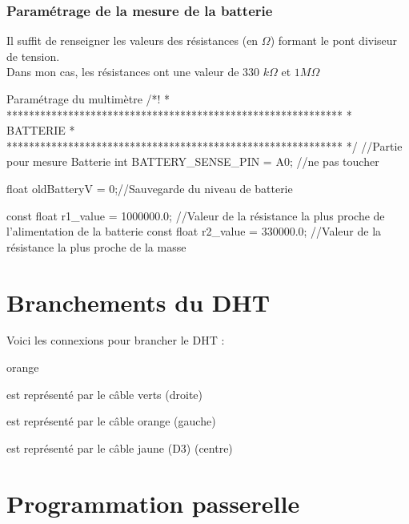 \subsection{Paramétrage de la mesure de la batterie}

Il suffit de renseigner les valeurs des résistances (en $\Omega$) formant le pont diviseur de tension.\\
Dans mon cas, les résistances ont une valeur de 330 $k\Omega$ et $1 M\Omega$


\begin{Cpp}{Paramétrage du multimètre}
    /*!
    * ************************************************************
    * BATTERIE
    * ************************************************************
    */
   //Partie pour mesure Batterie
   int BATTERY_SENSE_PIN = A0;  //ne pas toucher
   
   float oldBatteryV = 0;//Sauvegarde du niveau de batterie
   
   const float r1_value = 1000000.0; //Valeur de la résistance la plus proche de l'alimentation de la batterie
   const float r2_value = 330000.0; //Valeur de la résistance la plus proche de la masse

\end{Cpp}




\chapter{Branchements du DHT}


Voici les connexions pour brancher le DHT : 

\begin{items}{orange}{\Triangle}
  \item {} est représenté par le câble verts (droite)
  \item {} est représenté par le câble orange (gauche)
  \item {} est représenté par le câble jaune (D3) (centre)
\end{items}

\chapter{Programmation passerelle}

